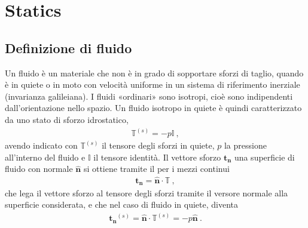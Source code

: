 \documentclass[letterpaper,10pt,italian]{jupyterBook}
\begin{document}
\sphinxstepscope


\chapter{Statics}
\label{\detokenize{polimi/fluidmechanics-ita/template/capitoli/01_statica/02teoria:statics}}\label{\detokenize{polimi/fluidmechanics-ita/template/capitoli/01_statica/02teoria:fluid-mechanics-statics}}\label{\detokenize{polimi/fluidmechanics-ita/template/capitoli/01_statica/02teoria::doc}}

\section{Definizione di fluido}
\label{\detokenize{polimi/fluidmechanics-ita/template/capitoli/01_statica/02teoria:definizione-di-fluido}}\label{\detokenize{polimi/fluidmechanics-ita/template/capitoli/01_statica/02teoria:fluid-mechanics-statics-def}}
\sphinxAtStartPar
Un fluido è un materiale che non è in grado di sopportare sforzi di
taglio, quando è in quiete o in moto con velocità uniforme in un sistema
di riferimento inerziale (invarianza galileiana). I fluidi «ordinari»
sono isotropi, cioè sono indipendenti dall’orientazione nello spazio. Un
fluido isotropo in quiete è quindi caratterizzato da uno stato di sforzo
idrostatico,
\begin{equation*}
\begin{split}\mathbb{T}^{(s)} = - p \mathbb{I} \ ,\end{split}
\end{equation*}
\sphinxAtStartPar
avendo indicato
con \(\mathbb{T}^{(s)}\) il tensore degli sforzi in quiete, \(p\) la
pressione all’interno del fluido e \(\mathbb{I}\) il tensore identità. Il
vettore sforzo \(\mathbf{t_n}\)  una superficie di fluido con
normale \(\mathbf{\hat{n}}\) si ottiene tramite il  per i
mezzi continui
\begin{equation*}
\begin{split}\mathbf{t_n} = \mathbf{\hat{n}} \cdot \mathbb{T} \ ,\end{split}
\end{equation*}
\sphinxAtStartPar
che lega
il vettore sforzo al tensore degli sforzi tramite il versore normale
alla superficie considerata, e che nel caso di fluido in quiete, diventa
\begin{equation*}
\begin{split}\mathbf{t_n}^{(s)} = \mathbf{\hat{n}} \cdot \mathbb{T}^{(s)}  = - p \mathbf{\hat{n}} \ .\end{split}
\end{equation*}
\end{document}

